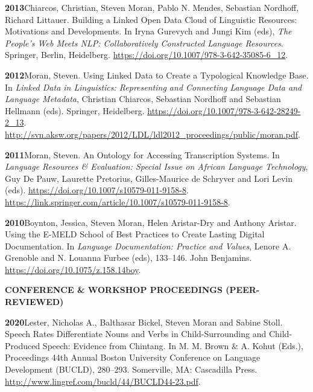 \documentclass[11pt]{article}
\newcommand{\hangpara}{
 \setlength{\parindent}{0in} %
 \hangindent=0.42in %
}
\begin{document}
\vskip 6pt
\hangpara
{\bf 2013}\hspace{1ex}Chiarcos, Christian, Steven Moran, Pablo N. Mendes, Sebastian Nordhoff, Richard Littauer. Building a Linked Open Data Cloud of Linguistic Resources: Motivations and Developments. In Iryna Gurevych and Jungi Kim (eds), {\it The People's Web Meets NLP: Collaboratively Constructed Language Resources}. Springer, Berlin, Heidelberg. \url{https://doi.org/10.1007/978-3-642-35085-6_12}.


\vskip 6pt
\hangpara
{\bf 2012}\hspace{1ex}Moran, Steven. Using Linked Data to Create a Typological Knowledge Base. In {\it Linked Data in Linguistics: Representing and Connecting Language Data and Language Metadata}, Christian Chiarcos, Sebastian Nordhoff and Sebastian Hellmann (eds). Springer, Heidelberg. \url{https://doi.org/10.1007/978-3-642-28249-2_13}. \url{http://svn.aksw.org/papers/2012/LDL/ldl2012_proceedings/public/moran.pdf}.

\vskip 6pt
\hangpara
{\bf 2011}\hspace{1ex}Moran, Steven. An Ontology for Accessing Transcription Systems. In {\it Language Resources \& Evaluation: Special Issue on African Language Technology}, Guy De Pauw, Laurette Pretorius, Gilles-Maurice de Schryver and Lori Levin (eds). \url{https://doi.org/10.1007/s10579-011-9158-8}. \url{https://link.springer.com/article/10.1007/s10579-011-9158-8}.%

\vskip 6pt
\hangpara
{\bf 2010}\hspace{1ex}Boynton, Jessica, Steven Moran, Helen Aristar-Dry and Anthony Aristar. Using the E-MELD School of Best Practices to Create Lasting Digital Documentation. In {\it Language Documentation: Practice and Values}, Lenore A. Grenoble and N. Louanna Furbee (eds), 133--146. John Benjamins. \url{https://doi.org/10.1075/z.158.14boy}.


\vskip 20pt
\begin{flushleft}
{\bf CONFERENCE \& WORKSHOP PROCEEDINGS (PEER-REVIEWED)}
\end{flushleft}

\hangpara
{\bf 2020}\hspace{1ex}Lester, Nicholas A., Balthasar Bickel, Steven Moran and Sabine Stoll. Speech Rates Differentiate Nouns and Verbs in Child-Surrounding and Child-Produced Speech: Evidence from Chintang. In M. M. Brown \& A. Kohut (Eds.), Proceedings 44th Annual Boston University Conference on Language Development (BUCLD), 280--293. Somerville, MA: Cascadilla Press. \url{http://www.lingref.com/bucld/44/BUCLD44-23.pdf}.
\end{document}
